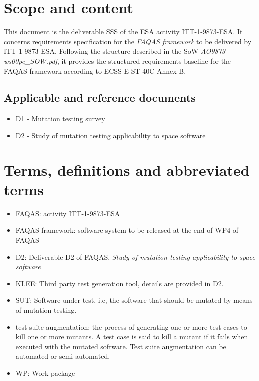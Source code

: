
\chapter{Scope and content}

This document is the deliverable SSS of the ESA activity ITT-1-9873-ESA. It concerns requirements specification for the \emph{FAQAS framework} to be delivered by ITT-1-9873-ESA. Following the structure described in the SoW \emph{AO9873-ws00pe\_SOW.pdf}, it provides the structured requirements baseline for the FAQAS framework according to ECSS-E-ST-40C Annex B.
 
\section{Applicable and reference documents}

\begin{itemize}
\item{D1 - Mutation testing survey}
\item{D2 - Study of mutation testing applicability to space software}
\end{itemize}

\chapter{Terms, definitions and abbreviated terms}

\begin{itemize}
\item{FAQAS}: activity ITT-1-9873-ESA
\item{FAQAS-framework}: software system to be released at the end of WP4 of FAQAS
\item{D2}: Deliverable D2 of FAQAS, \emph{Study of mutation testing applicability to space software}
\item{KLEE}: Third party test generation tool, details are provided in D2.
\item{SUT}: Software under test, i.e, the software that should be mutated by means of mutation testing.
\item{test suite augmentation}: the process of generating one or more test cases to kill one or more mutants. A test case is said to kill a mutant if it fails when executed with the mutated software. Test suite augmentation can be automated or semi-automated.
\item{WP}: Work package
\end{itemize}

\clearpage
 

